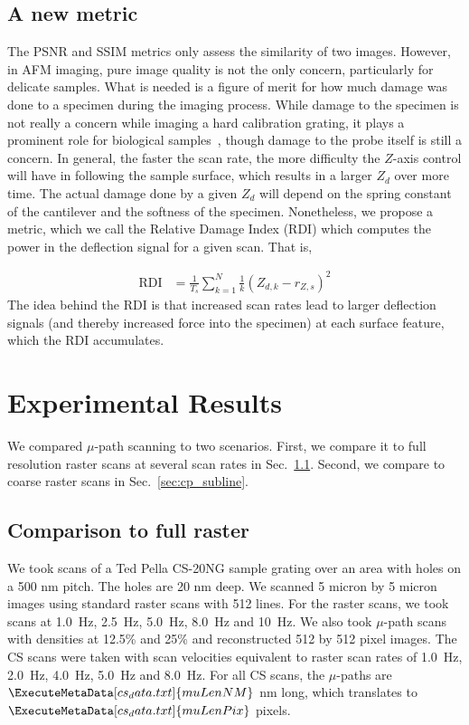 \documentclass[journal]{IEEEtran}
\newcommand{\scanD}[1]{\ExecuteMetaData[cs_data.txt]{#1}}
\begin{document}
\subsection{A new metric}
The PSNR and SSIM metrics only assess the similarity of two images.
However, in AFM imaging, pure image quality is not the only concern,
particularly for delicate samples. What is needed is a figure of merit
for how much damage was done to a specimen during the imaging process.
While damage to the specimen is not really a concern while imaging a
hard calibration grating, it plays a prominent role for biological
samples~\cite{ando_highspeed_2008}, though damage to the probe itself
is still a concern. In general, the faster the scan rate, the more
difficulty the $Z$-axis control will have in following the sample
surface, which results in a larger $Z_d$ over more time. The actual
damage done by a given $Z_d$ will depend on the spring constant of the
cantilever and the softness of the specimen. Nonetheless, we propose a
metric, which we call the Relative Damage Index (RDI) which computes
the power in the deflection signal for a given scan. That is,

\begin{align}
  \text{RDI} &= \frac{1}{T_s}\sum_{k=1}^N \frac{1}{k} \left(Z_{d,k} - r_{Z,s}\right)^2 \label{eqn:RDI}
\end{align}
The idea behind the RDI is that increased scan rates lead to larger
deflection signals (and thereby increased force into the specimen) at
each surface feature, which the RDI accumulates.

\section{Experimental Results}\label{sec:results}
We compared $\mu$-path scanning to two scenarios. First, we compare it
to full resolution raster scans at several scan rates in
Sec.~\ref{sec:cp_full}. Second, we compare to coarse raster scans in
Sec.~\ref{sec:cp_subline}.

\subsection{Comparison to full raster}\label{sec:cp_full}
We took scans of a Ted Pella CS-20NG sample grating over an area with
holes on a 500 nm pitch. The holes are 20 nm deep. We scanned 5 micron
by 5 micron images using standard raster scans with 512 lines. For the
raster scans, we took scans at 1.0~Hz, 2.5~Hz, 5.0~Hz, 8.0~Hz and
10~Hz. We also took $\mu$-path scans with densities at 12.5\% and
25\% and reconstructed 512 by 512 pixel images. The CS scans were
taken with scan velocities equivalent to raster scan rates of 1.0~Hz,
2.0~Hz, 4.0~Hz, 5.0~Hz and 8.0~Hz. For all CS scans, the $\mu$-paths are
$\scanD{muLenNM}$ nm long, which translates to $\scanD{muLenPix}$
pixels.
\end{document}
